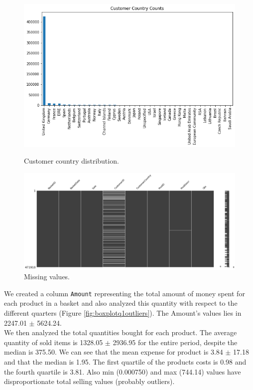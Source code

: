 \documentclass[12pt]{article}
\begin{document}
\begin{figure}[!h]
\centering
    \includegraphics[scale=0.34]{customercountry.png}
    \caption{Customer country distribution.}
    \label{fig:customercountry}
\endminipage\hfill
{}
\centering
    \includegraphics[scale=0.16]{images/missingValues.png}
    \caption{Missing values.}
    \label{fig:missingvalues}
\endminipage\hfill
\label{fig:customersale}
\end{figure}

We created a column \texttt{Amount} representing the total amount of money spent for each product in a basket and also analyzed this quantity with respect to the different quarters (Figure \ref{fig:boxplotq1outliers}). The Amount's values lies in 2247.01 $\pm$ 5624.24.\\
We then analyzed the total quantities bought for each product. The average quantity of sold items is 1328.05 $\pm$ 2936.95 for the entire period, despite the median is 375.50.
We can see that the mean expense for product is 3.84 $\pm$ 17.18 and that the median is 1.95. The first quartile of the products costs is 0.98 and the fourth quartile is 3.81. Also min (0.000750) and max (744.14) values have disproportionate total selling values (probably outliers).
\end{document}
